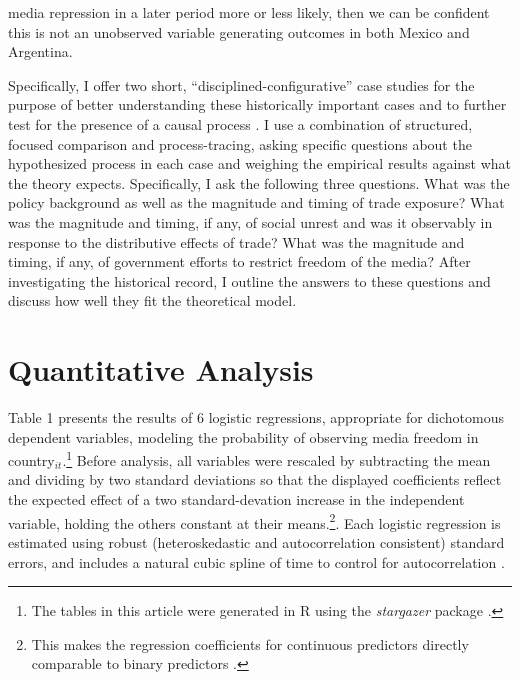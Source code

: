 \documentclass[12pt,a4paper]{article}\usepackage[]{graphicx}\usepackage[]{color}
\begin{document}
media repression in a later period more or less likely, then we can be confident this is not an unobserved variable generating outcomes in both Mexico and Argentina.

Specifically, I offer two short, ``disciplined-configurative'' case studies for the purpose of better understanding these historically important cases and to further test for the presence of a causal process \parencite[75]{george2005case}. I use a combination of structured, focused comparison and process-tracing, asking specific questions about the hypothesized process in each case and weighing the empirical results against what the theory expects. Specifically, I ask the following three questions. What was the policy background as well as the magnitude and timing of trade exposure? What was the magnitude and timing, if any, of social unrest and was it observably in response to the distributive effects of trade? What was the magnitude and timing, if any, of government efforts to restrict freedom of the media? After investigating the historical record, I outline the answers to these questions and discuss how well they fit the theoretical model.

\section{Quantitative Analysis}

Table 1 presents the results of 6 logistic regressions, appropriate for dichotomous dependent variables, modeling the probability of observing media freedom in country$_{it}$.\footnote{The tables in this article were generated in R using the \emph{stargazer} package \parencite{stargazerLaTeXcod:vw}.} Before analysis, all variables were rescaled by subtracting the mean and dividing by two standard deviations so that the displayed coefficients reflect the expected effect of a two standard-devation increase in the independent variable, holding the others constant at their means.\footnote{This makes the regression coefficients for continuous predictors directly comparable to binary predictors \parencite{Gelman:2008gz}.}. Each logistic regression is estimated using robust (heteroskedastic and autocorrelation consistent) standard errors, and includes a natural cubic spline of time to control for autocorrelation \parencite{Beck:1998wg}.
\end{document}
